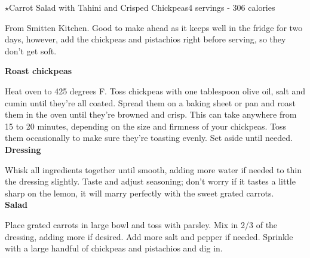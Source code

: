 \begin{recipe}{$\star$Carrot Salad with Tahini and Crisped Chickpeas}{4 servings - 306 calories}{}

\freeform From Smitten Kitchen. Good to make ahead as it keeps well in the fridge for two days, however, add the chickpeas and pistachios right before serving, so they don’t get soft.


\textbf{Roast chickpeas}

Heat oven to 425 degrees F. Toss chickpeas with one tablespoon olive oil, salt and cumin until they’re all coated. Spread them on a baking sheet or pan and roast them in the oven until they’re browned and crisp. This can take anywhere from 15 to 20 minutes, depending on the size and firmness of your chickpeas. Toss them occasionally to make sure they’re toasting evenly. Set aside until needed.\\

\textbf{Dressing}

Whisk all ingredients together until smooth, adding more water if needed to thin the dressing slightly. Taste and adjust seasoning; don’t worry if it tastes a little sharp on the lemon, it will marry perfectly with the sweet grated carrots.\\

\textbf{Salad}

Place grated carrots in large bowl and toss with parsley. Mix in 2/3 of the dressing, adding more if desired. Add more salt and pepper if needed. Sprinkle with a large handful of chickpeas and pistachios and dig in.

\end{recipe}